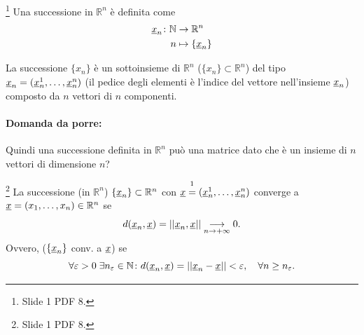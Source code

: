 \begin{definition}\footnote{Slide 1 PDF 8.}
    Una successione in $\mathbb R^n$ è definita come
    \begin{equation*}
        \begin{aligned}
            \uline x_n\colon\mathbb N&\rightarrow\mathbb R^n\\
            n&\mapsto\{\uline x_n\}
        \end{aligned}
    \end{equation*}
\end{definition}

La successione $\{x_n\}$ è un sottoinsieme di $\mathbb R^n$ ($\{x_n\}\subset \mathbb R^n$) del tipo $\uline x_n=(\uline x_n^1,\hdots,\uline x_n^n)$ (il pedice degli elementi è l'indice del vettore nell'insieme $\uline x_n$) composto da $n$ vettori di $n$ componenti.

\paragraph{Domanda da porre:} Quindi una successione definita in $\mathbb R^n$ può una matrice dato che è un insieme di $n$ vettori di dimensione $n$?

\begin{definition}\label{def:successione_convergente_AN2}\footnote{Slide 1 PDF 8.}
    La successione (in $\mathbb R^n$) $\{\uline x_n\}\subset\mathbb R^n$ con $\uline x\overset{\footnotemark}{=}(\uline x_n^1,\hdots,\uline x_n^n)$ converge a $\uline x=(x_1,\hdots,x_n)\in\mathbb R^n$ se
    \begin{equation}\label{eq:limite_successione_convergente_spazio_metrico}
         d(\uline x_n,\uline x)=||\uline x_n,\uline x||\underset{n\rightarrow+\infty}{\longrightarrow}0.
    \end{equation}
    Ovvero, ($\{\uline x_n\}$ conv. a $\uline x$) se
    \begin{equation}\label{eq:limite_successione_convergente_spazio_metrico1}
        \forall\varepsilon>0\;\exists n_\varepsilon \in\mathbb N\colon d(\uline x_n,\uline x) = ||\uline x_n-\uline x||<\varepsilon,\quad \forall n\geq n_\varepsilon.
    \end{equation}
\end{definition}

